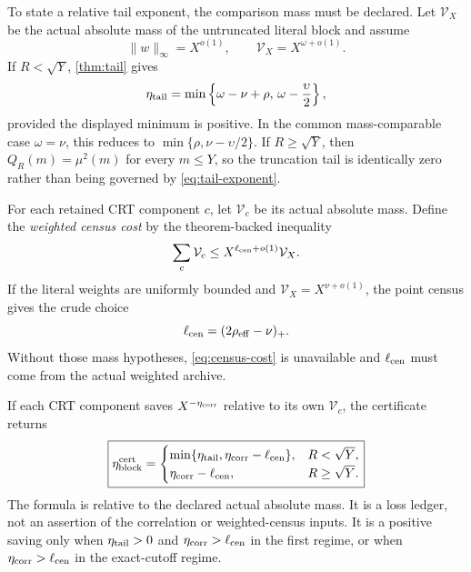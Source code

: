 \documentclass[11pt]{article}
\theoremstyle{definition}
\theoremstyle{remark}
\begin{document}
To state a relative tail exponent, the comparison mass must be
declared.  Let \(\mathcal V_X\) be the actual absolute mass of the
untruncated literal block and assume
\[
 \|w\|_\infty=X^{o(1)},
 \qquad
 \mathcal V_X=X^{\omega+o(1)}.
\]
If \(R<\sqrt Y\), \cref{thm:tail} gives
\begin{equation}
 \eta_{\rm tail}
 =
 \min\left\{\omega-\nu+\rho,\,
             \omega-\frac{\upsilon}{2}\right\},
\label{eq:tail-exponent}
\end{equation}
provided the displayed minimum is positive.  In the common
mass-comparable case \(\omega=\nu\), this reduces to
\(\min\{\rho,\nu-\upsilon/2\}\).  If \(R\ge\sqrt Y\), then
\(Q_R(m)=\mu^2(m)\) for every \(m\le Y\), so the truncation tail is
identically zero rather than being governed by
\eqref{eq:tail-exponent}.

For each retained CRT component \(c\), let \(\mathcal V_c\) be its
actual absolute mass.  Define the \emph{weighted census cost} by the
theorem-backed inequality
\begin{equation}
 \sum_c\mathcal V_c
 \le X^{\ell_{\rm cen}+o(1)}\mathcal V_X.
\label{eq:weighted-census}
\end{equation}
If the literal weights are uniformly bounded and
\(\mathcal V_X=X^{\nu+o(1)}\), the point census gives the crude choice
\begin{equation}
 \ell_{\rm cen}=(2\rho_{\rm eff}-\nu)_+.
\label{eq:census-cost}
\end{equation}
Without those mass hypotheses, \eqref{eq:census-cost} is unavailable
and \(\ell_{\rm cen}\) must come from the actual weighted archive.

If each CRT component saves \(X^{-\eta_{\rm corr}}\) relative to
its own \(\mathcal V_c\), the certificate returns
\begin{equation}
 \boxed{
 \eta_{\rm block}^{\rm cert}
 =
 \begin{cases}
 \min\{\eta_{\rm tail},
       \eta_{\rm corr}-\ell_{\rm cen}\},
       &R<\sqrt Y,\\
 \eta_{\rm corr}-\ell_{\rm cen},
       &R\ge\sqrt Y.
 \end{cases}}
\label{eq:block-certificate}
\end{equation}
The formula is relative to the declared actual absolute mass.  It is
a loss ledger, not an assertion of the correlation or weighted-census
inputs.  It is a positive saving only when
\(\eta_{\rm tail}>0\) and
\(\eta_{\rm corr}>\ell_{\rm cen}\) in the first regime, or when
\(\eta_{\rm corr}>\ell_{\rm cen}\) in the exact-cutoff regime.
\end{document}
